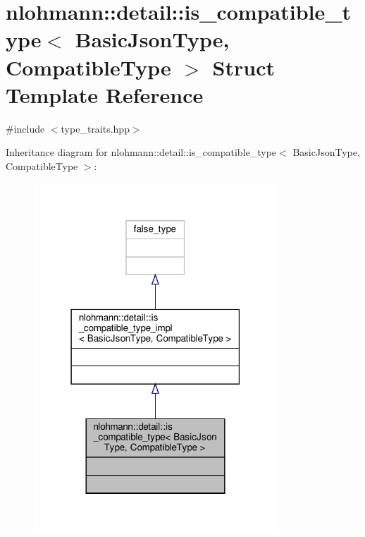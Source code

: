 \hypertarget{structnlohmann_1_1detail_1_1is__compatible__type}{}\section{nlohmann\+:\+:detail\+:\+:is\+\_\+compatible\+\_\+type$<$ Basic\+Json\+Type, Compatible\+Type $>$ Struct Template Reference}
\label{structnlohmann_1_1detail_1_1is__compatible__type}


{\ttfamily \#include $<$type\+\_\+traits.\+hpp$>$}



Inheritance diagram for nlohmann\+:\+:detail\+:\+:is\+\_\+compatible\+\_\+type$<$ Basic\+Json\+Type, Compatible\+Type $>$\+:\nopagebreak
\begin{figure}[H]
\begin{center}
\leavevmode
\includegraphics[width=259pt]{structnlohmann_1_1detail_1_1is__compatible__type__inherit__graph}
\end{center}
\end{figure}


